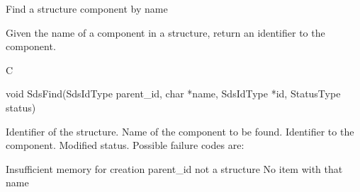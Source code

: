 \begin{manroutinedescription}
      Find a structure component by name

      Given the name of a component in a structure, return an
      identifier to the component.
 
      C

      void SdsFind(SdsIdType parent\_{}id, char *name, SdsIdType *id,
         StatusType {\mantt{*}} {} status)
 
\begin{manparametertable}
 Identifier of the %
structure.
 Name of the component to be found.
 Identifier to the component.
 Modified status. Possible %
failure codes are:
\end{manparametertable}
\begin{mantwocolumntable}
Insufficient memory for creation
parent\_{}id not a structure
No item with that name
\end{mantwocolumntable}
\end{manroutinedescription}



